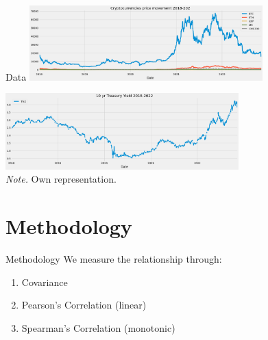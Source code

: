 \documentclass[11pt]{beamer}
\begin{document}

\begin{frame}{Data}
  \centering
    \includegraphics[width=9cm,keepaspectratio]{images/movement_crypto.png}
    
    \vspace{2}
    \includegraphics[width=9cm,keepaspectratio]{images/movement_treasury.png}\\
     
\tiny{\textit{Note.} Own representation.}
\end{frame}


\section{Methodology}
\begin{frame}{Methodology}
We measure the relationship through:
    
    \begin{enumerate}
        \item Covariance
        \item Pearson's Correlation (linear)
        \item Spearman's Correlation (monotonic)
    \end{enumerate}
\end{frame}

\end{document}
